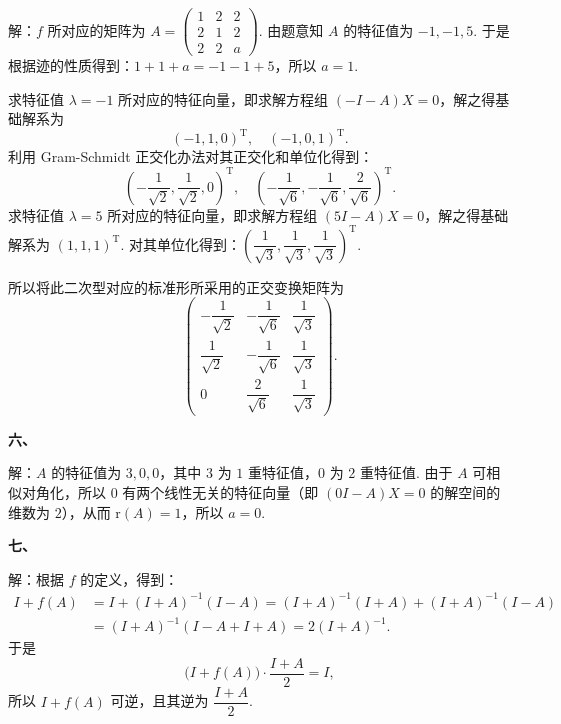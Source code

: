 \documentclass[a4paper,11pt]{ctexart}
\newcommand{\rk}{\mathrm{r}}
\newcommand{\T}{\mathrm{T}}
\begin{document}
解：$f$ 所对应的矩阵为 $A = \begin{pmatrix} 1 & 2 & 2 \\ 2 & 1 & 2 \\ 2 & 2 & a \end{pmatrix}$. 由题意知 $A$ 的特征值为 $-1, -1, 5$. 于是根据迹的性质得到：$1 + 1 + a = -1 - 1 + 5$，所以 $a = 1$.

求特征值 $\lambda = -1$ 所对应的特征向量，即求解方程组 $(-I - A)X = 0$，解之得基础解系为
\[
  (-1, 1, 0)^{\T},\quad (-1, 0, 1)^{\T}.
\]
利用 Gram-Schmidt 正交化办法对其正交化和单位化得到：
\[
  \left(-\frac{1}{\sqrt{2}}, \frac{1}{\sqrt{2}}, 0\right)^{\T},\quad \left(-\frac{1}{\sqrt{6}}, -\frac{1}{\sqrt{6}}, \frac{2}{\sqrt{6}}\right)^{\T}.
\]
求特征值 $\lambda = 5$ 所对应的特征向量，即求解方程组 $(5I - A)X = 0$，解之得基础解系为 $(1, 1, 1)^{\T}$. 对其单位化得到：$\left(\dfrac{1}{\sqrt{3}}, \dfrac{1}{\sqrt{3}}, \dfrac{1}{\sqrt{3}}\right)^{\T}$.

所以将此二次型对应的标准形所采用的正交变换矩阵为
\[
  \begin{pmatrix}
    -\dfrac{1}{\sqrt{2}} & -\dfrac{1}{\sqrt{6}} & \dfrac{1}{\sqrt{3}} \\[0.8em]
    \dfrac{1}{\sqrt{2}} & -\dfrac{1}{\sqrt{6}} & \dfrac{1}{\sqrt{3}} \\[0.8em]
    0 & \dfrac{2}{\sqrt{6}} & \dfrac{1}{\sqrt{3}}
  \end{pmatrix}.
\]

\vspace{0.5em}

\textbf{六、}

解：$A$ 的特征值为 $3, 0, 0$，其中 $3$ 为 $1$ 重特征值，$0$ 为 $2$ 重特征值. 由于 $A$ 可相似对角化，所以 $0$ 有两个线性无关的特征向量（即 $(0I - A)X = 0$ 的解空间的维数为 $2$），从而 $\rk(A) = 1$，所以 $a = 0$.

\vspace{0.5em}

\textbf{七、}

解：根据 $f$ 的定义，得到：
\begin{align*}
  I + f(A) &= I + (I + A)^{-1}(I - A) = (I + A)^{-1}(I + A) + (I + A)^{-1}(I - A) \\
  &= (I + A)^{-1}(I - A + I + A) = 2(I + A)^{-1}.
\end{align*}
于是
\[
  \bigl(I + f(A)\bigr) \cdot \frac{I + A}{2} = I,
\]
所以 $I + f(A)$ 可逆，且其逆为 $\dfrac{I + A}{2}$.

\vspace{0.5em}
\end{document}

